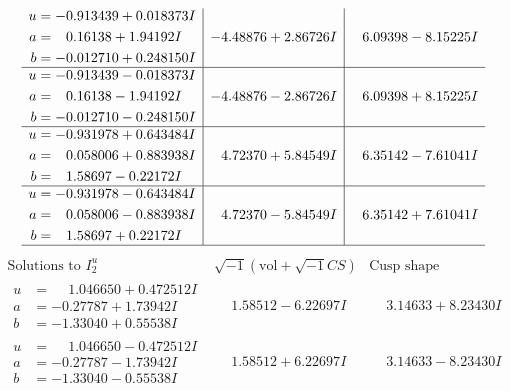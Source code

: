 \documentclass[1p]{elsarticle_modified}
\theoremstyle{definition}
\newcommand{\I}{\sqrt{-1}}
\begin{document}
$$\begin{array}{c|c|c}
\begin{aligned}
u &= -0.913439 + 0.018373 I \\
a &= \phantom{-}0.16138 + 1.94192 I \\
b &= -0.012710 + 0.248150 I\end{aligned}
 & -4.48876 + 2.86726 I & \phantom{-}6.09398 - 8.15225 I \\ \hline\begin{aligned}
u &= -0.913439 - 0.018373 I \\
a &= \phantom{-}0.16138 - 1.94192 I \\
b &= -0.012710 - 0.248150 I\end{aligned}
 & -4.48876 - 2.86726 I & \phantom{-}6.09398 + 8.15225 I \\ \hline\begin{aligned}
u &= -0.931978 + 0.643484 I \\
a &= \phantom{-}0.058006 + 0.883938 I \\
b &= \phantom{-}1.58697 - 0.22172 I\end{aligned}
 & \phantom{-}4.72370 + 5.84549 I & \phantom{-}6.35142 - 7.61041 I \\ \hline\begin{aligned}
u &= -0.931978 - 0.643484 I \\
a &= \phantom{-}0.058006 - 0.883938 I \\
b &= \phantom{-}1.58697 + 0.22172 I\end{aligned}
 & \phantom{-}4.72370 - 5.84549 I & \phantom{-}6.35142 + 7.61041 I\\
 \hline 
 \end{array}$$\newpage$$\begin{array}{c|c|c}  
\text{Solutions to }I^u_{2}& \I (\text{vol} + \sqrt{-1}CS) & \text{Cusp shape}\\
 \hline 
\begin{aligned}
u &= \phantom{-}1.046650 + 0.472512 I \\
a &= -0.27787 + 1.73942 I \\
b &= -1.33040 + 0.55538 I\end{aligned}
 & \phantom{-}1.58512 - 6.22697 I & \phantom{-}3.14633 + 8.23430 I \\ \hline\begin{aligned}
u &= \phantom{-}1.046650 - 0.472512 I \\
a &= -0.27787 - 1.73942 I \\
b &= -1.33040 - 0.55538 I\end{aligned}
 & \phantom{-}1.58512 + 6.22697 I & \phantom{-}3.14633 - 8.23430 I \\ \hline\begin{aligned}

\end{aligned}
\end{array}$$
\end{document}
